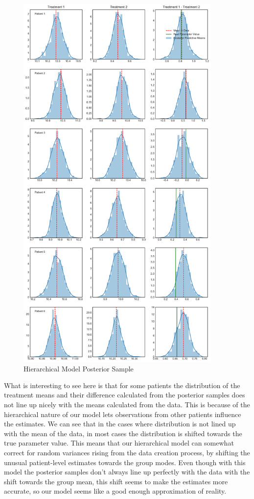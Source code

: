\documentclass[12pt,a4paper,leqno]{report}
\theoremstyle{plain}
\theoremstyle{definition}
\theoremstyle{remark}
\begin{document}
\begin{figure}[H]
    \caption{Hierarchical Model Posterior Sample}\label{hierarchicalmodelposteriorsampling}
    \bigskip
    \centering
    \includegraphics[width=\textwidth,height=7.6in,keepaspectratio]{hierarchical_model_posterior_sampling.pdf}
\end{figure}

What is interesting to see here is that for some patients the distribution of the
treatment means and their difference calculated from the posterior samples does not line
up nicely with the means calculated from the data. This is because of the hierarchical
nature of our model lets observations from other patients influence the estimates.
We can see that in the cases where distribution is not lined up with the
mean of the data, in most cases the distribution is shifted towards the true parameter
value. This means that our hierarchical model can somewhat correct for random
variances rising from the data creation process, by shifting the unusual patient-level
estimates towards the group modes. Even though with this model the posterior samples
don't always line up perfectly with the data with the shift towards the group mean, this
shift seems to make the estimates more accurate, so our model seems like a good enough
approximation of reality.
\end{document}
